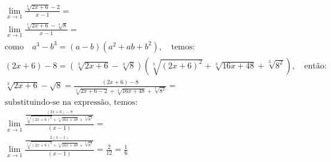 \begin{ex}
\begin{align}
&\lim_{x\rightarrow 1} \frac{\sqrt[3]{2x+6}-2}{x-1}=\nonumber\\
&\lim_{x\rightarrow 1} \frac{\sqrt[3]{2x+6}-\sqrt[3]{8}}{x-1}=\nonumber\\
&\text{como}\quad a^3-b^3=(a-b)(a^2+ab+b^2),\quad\text{temos:}\nonumber\\
&(2x+6)-8=(\sqrt[3]{2x+6}-\sqrt[3]{8})(\sqrt[3]{(2x+6)^2}+\sqrt[3]{16x+48}+\sqrt[3]{8^2}),\quad\text{então:}\nonumber\\
&\sqrt[3]{2x+6}-\sqrt{8}=\frac{(2x+6)-8}{\sqrt[3]{2x+6-2}+\sqrt[3]{16x+48}+\sqrt[3]{8^2}}=\nonumber\\
&\text{substituindo-se na expressão, temos:}\nonumber\\
&\lim_{x\rightarrow 1} \frac{\frac{(2x+6)-8}{\sqrt[3]{(2x+6)^2}+\sqrt[3]{16x+48}+\sqrt[3]{8^2}}}{(x-1)}=\nonumber\\
&\lim_{x\rightarrow 1} \frac{\frac{2(x-1)}{\sqrt[3]{(2x+6)^2}+\sqrt[3]{16x+48}+\sqrt[3]{8^2}}}{(x-1)}=\frac{2}{12}=\frac{1}{6}\nonumber
\end{align}
\end{ex}